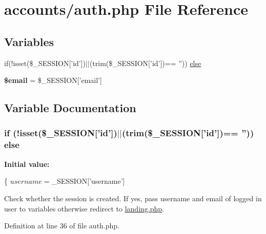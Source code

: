 \hypertarget{auth_8php}{\section{accounts/auth.php File Reference}
\label{auth_8php}
}
\subsection*{Variables}
\begin{DoxyCompactItemize}
\item 
if(!isset(\$\-\_\-\-S\-E\-S\-S\-I\-O\-N\mbox{[}'id'\mbox{]})$|$$|$(trim(\$\-\_\-\-S\-E\-S\-S\-I\-O\-N\mbox{[}'id'\mbox{]})== '')) \hyperlink{auth_8php_af520ee461d08ce3d0037800137bc1e81}{else}
\item 
\hypertarget{auth_8php_ad634f418b20382e2802f80532d76d3cd}{{\bfseries \$email} = \$\-\_\-\-S\-E\-S\-S\-I\-O\-N\mbox{[}'email'\mbox{]}}\label{auth_8php_ad634f418b20382e2802f80532d76d3cd}

\end{DoxyCompactItemize}


\subsection{Variable Documentation}
\hypertarget{auth_8php_af520ee461d08ce3d0037800137bc1e81}{
\subsubsection[{else}]{\setlength{\rightskip}{0pt plus 5cm}if (!isset(\$\-\_\-\-S\-E\-S\-S\-I\-O\-N\mbox{[}'id'\mbox{]})$|$$|$(trim(\$\-\_\-\-S\-E\-S\-S\-I\-O\-N\mbox{[}'id'\mbox{]})== '')) else}}\label{auth_8php_af520ee461d08ce3d0037800137bc1e81}
{\bfseries Initial value\-:}
\begin{DoxyCode}
\{
        $username = $\_SESSION[\textcolor{stringliteral}{'username'}]
\end{DoxyCode}
Check whether the session is created. If yes, pass username and email of logged in user to variables otherwise redirect to \hyperlink{landing_8php}{landing.\-php}. 

Definition at line 36 of file auth.\-php.

